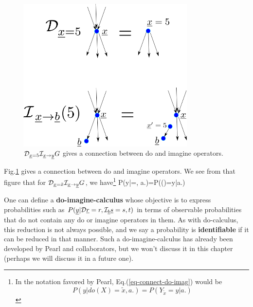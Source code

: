 \begin{figure}[h!]
\centering
\includegraphics[width=3.5in]
{counterf/rho-kappa.png}
\caption{${\cal D}_{{\underline{x}}=5}{\cal I}_{{\underline{x}}\rightarrow {\underline{y}}}G$
gives a connection
between do and imagine operators.
} 
\label{fig-rho-kappa}
\end{figure}

Fig.\ref{fig-rho-kappa}
gives  a connection
between do and imagine
operators.
We see
from that figure that
for ${\cal D}_{{\underline{x}}=\tilde{x}}
{\cal I}_{{\underline{x}}\rightarrow{\underline{y}}}G$, we have\footnote{In the
notation favored by Pearl, Eq.(\ref{eq-connect-do-imag})
 would be
$$P(y|do(X)=\tilde{x}, a.)=P(Y_{\tilde{x}}=y|a.)$$}
\beq
P(y|\cald\rvx=, a.)=P(\rvy()=y|a.)
\label{eq-connect-do-imag}
\eeq


One can define
a {\bf do-imagine-calculus}
whose
objective
is to 
express
probabilities such as 
$P({\underline{y}}|{\cal D}{\underline{r}}=r,
{\cal I}_{\underline{b}} {\underline{s}}=s, t)$
in terms of observable 
probabilities
that do not
contain
any do or imagine
operators in them.
As with
do-calculus,
this reduction
is not 
always possible,
and we say a probability is
{\bf identifiable}
if it  can be reduced
in that manner.
Such a do-imagine-calculus
has already
been developed
by Pearl and collaborators,
but
we won't 
discuss it in this chapter (perhaps
we  will discuss it
in a future one).



